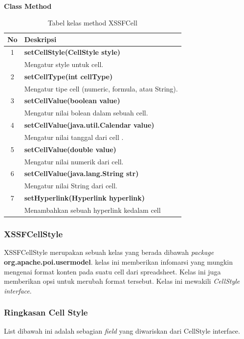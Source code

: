 \noindent \textbf{Class Method}
\begin{table}[H]
		\centering
		\caption{Tabel kelas method XSSFCell}
		\label{tab:methodXSSFCell}
	\begin{tabular}{|c|p{12cm}|}
		\hline
		\textbf{No} & \textbf{Deskripsi} \\ \hline \hline
		1 & \textbf{setCellStyle(CellStyle style)}\\
			&	Mengatur style untuk cell.\\ \hline 
		2 & \textbf{setCellType(int cellType)}\\
			&	Mengatur tipe cell (numeric, formula, atau String).\\ \hline
		3 & \textbf{setCellValue(boolean value)}\\
			&	Mengatur nilai bolean dalam sebuah cell.\\ \hline
		4 & \textbf{setCellValue(java.util.Calendar value)}\\
			&	Mengatur nilai tanggal dari cell .\\ \hline	
		5 & \textbf{setCellValue(double value)}\\
			&	Mengatur nilai numerik dari cell.\\ \hline
		6 & \textbf{setCellValue(java.lang.String str)}\\
			&	Mengatur nilai String dari cell.\\ \hline
		7 & \textbf{setHyperlink(Hyperlink hyperlink)}\\
			&	Menambahkan sebuah hyperlink kedalam cell\\ \hline					
	\end{tabular}
\end{table}

\subsubsection{XSSFCellStyle}
\label{subs:XSSFCellStyle}
XSSFCellStyle merupakan sebuah kelas yang berada dibawah \textit{package} \textbf{org.apache.poi.usermodel}. kelas ini memberikan infomarsi yang mungkin mengenai format konten pada suatu cell dari spreadsheet. Kelas ini juga memberikan opsi untuk merubah format tersebut. Kelas ini mewakili \textit{CellStyle interface}.\cite{apachepoi2}

\subsubsection{Ringkasan Cell Style}
\label{subs:Ringkasan_Cell_Style}
List dibawah ini adalah sebagian \textit{field} yang diwariskan dari CellStyle interface.\cite{apachepoi2}\\

